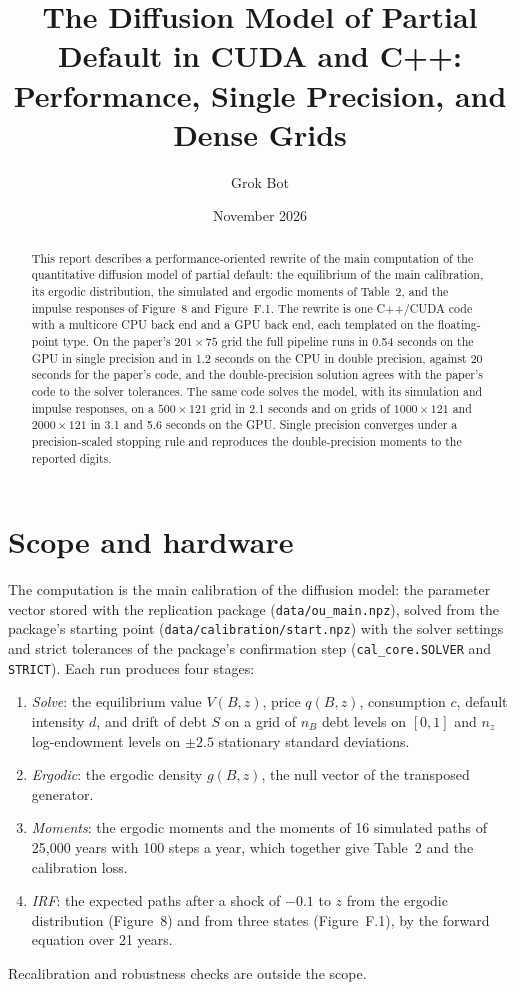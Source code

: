 \documentclass[11pt]{article}
\title{The Diffusion Model of Partial Default in CUDA and C++:\\ Performance, Single Precision, and Dense Grids}
\author{Grok Bot}
\date{November 2026}
\begin{document}
\maketitle

\begin{abstract}
\noindent This report describes a performance-oriented rewrite of the main computation of the quantitative diffusion model of partial default: the equilibrium of the main calibration, its ergodic distribution, the simulated and ergodic moments of Table~2, and the impulse responses of Figure~8 and Figure~F.1. The rewrite is one C++/CUDA code with a multicore CPU back end and a GPU back end, each templated on the floating-point type. On the paper's $201\times75$ grid the full pipeline runs in 0.54 seconds on the GPU in single precision and in 1.2 seconds on the CPU in double precision, against 20 seconds for the paper's code, and the double-precision solution agrees with the paper's code to the solver tolerances. The same code solves the model, with its simulation and impulse responses, on a $500\times121$ grid in 2.1 seconds and on grids of $1000\times121$ and $2000\times121$ in 3.1 and 5.6 seconds on the GPU. Single precision converges under a precision-scaled stopping rule and reproduces the double-precision moments to the reported digits.
\end{abstract}

\tableofcontents

\section{Scope and hardware}

The computation is the main calibration of the diffusion model: the parameter vector stored with the replication package (\texttt{data/ou\_main.npz}), solved from the package's starting point (\texttt{data/calibration/start.npz}) with the solver settings and strict tolerances of the package's confirmation step (\texttt{cal\_core.SOLVER} and \texttt{STRICT}). Each run produces four stages:
\begin{enumerate}
\item \emph{Solve}: the equilibrium value $V(B,z)$, price $q(B,z)$, consumption $c$, default intensity $d$, and drift of debt $S$ on a grid of $n_B$ debt levels on $[0,1]$ and $n_z$ log-endowment levels on $\pm2.5$ stationary standard deviations.
\item \emph{Ergodic}: the ergodic density $g(B,z)$, the null vector of the transposed generator.
\item \emph{Moments}: the ergodic moments and the moments of 16 simulated paths of 25{,}000 years with 100 steps a year, which together give Table~2 and the calibration loss.
\item \emph{IRF}: the expected paths after a shock of $-0.1$ to $z$ from the ergodic distribution (Figure~8) and from three states (Figure~F.1), by the forward equation over 21 years.
\end{enumerate}
Recalibration and robustness checks are outside the scope.
\end{document}
